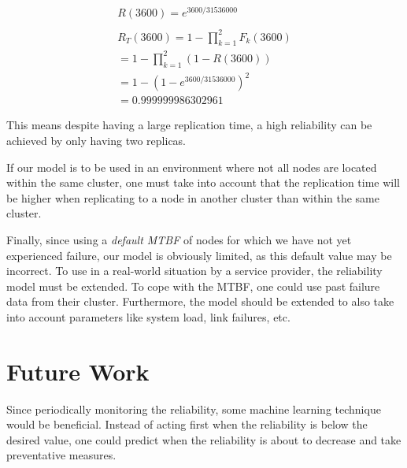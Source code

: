 \documentclass{cslthse-msc}
\begin{document}
\begin{equation*}
\begin{split}
R(3600) = e^{3600/31536000}\\
\\
R_{T}(3600) = 1 - \prod\limits_{k=1}^2 F_{k}(3600)\\
= 1 - \prod\limits_{k=1}^2 (1 - R(3600))\\
= 1 - (1 - e^{3600/31536000})^2\\
= 0.999999986302961
\end{split}
\end{equation*}

This means despite having a large replication time, a high reliability can be achieved by only having two replicas.

If our model is to be used in an environment where not all nodes are located within the same cluster, one must take into account that the replication time will be higher when replicating to a node in another cluster than within the same cluster.

Finally, since using a \emph{default MTBF} of nodes for which we have not yet experienced failure, our model is obviously limited, as this default value may be incorrect. To use in a real-world situation by a service provider, the reliability model must be extended. To cope with the MTBF, one could use past failure data from their cluster. Furthermore, the model should be extended to also take into account parameters like system load, link failures, etc. 



\chapter{Future Work} \label{ch:future_work}
Since periodically monitoring the reliability, some machine learning technique would be beneficial. Instead of acting first when the reliability is below the desired value, one could predict when the reliability is about to decrease and take preventative measures.
\end{document}

